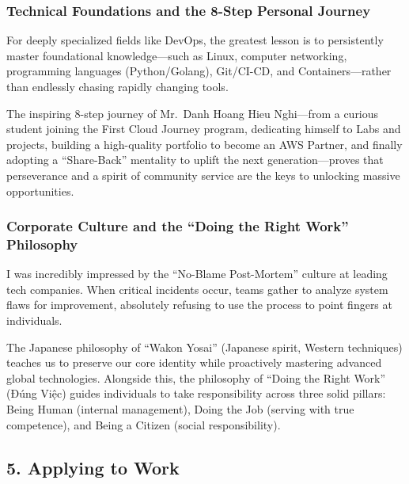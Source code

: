 \hypertarget{technical-foundations-and-the-8-step-personal-journey}{%
\subsubsection{Technical Foundations and the 8-Step Personal
Journey}}

For deeply specialized fields like DevOps, the greatest lesson is to
persistently master foundational knowledge---such as Linux, computer
networking, programming languages (Python/Golang), Git/CI-CD, and
Containers---rather than endlessly chasing rapidly changing tools.

The inspiring 8-step journey of Mr.~Danh Hoang Hieu Nghi---from a
curious student joining the First Cloud Journey program, dedicating
himself to Labs and projects, building a high-quality portfolio to
become an AWS Partner, and finally adopting a ``Share-Back'' mentality
to uplift the next generation---proves that perseverance and a spirit of
community service are the keys to unlocking massive opportunities.

\hypertarget{corporate-culture-and-the-doing-the-right-work-philosophy}{%
\subsubsection{Corporate Culture and the ``Doing the Right Work''
Philosophy}}

I was incredibly impressed by the ``No-Blame Post-Mortem'' culture at
leading tech companies. When critical incidents occur, teams gather to
analyze system flaws for improvement, absolutely refusing to use the
process to point fingers at individuals.

The Japanese philosophy of ``Wakon Yosai'' (Japanese spirit, Western
techniques) teaches us to preserve our core identity while proactively
mastering advanced global technologies. Alongside this, the philosophy
of ``Doing the Right Work'' (Đúng Việc) guides individuals to take
responsibility across three solid pillars: Being Human (internal
management), Doing the Job (serving with true competence), and Being a
Citizen (social responsibility).

\hypertarget{applying-to-work}{%
\subsection{5. Applying to Work}}

